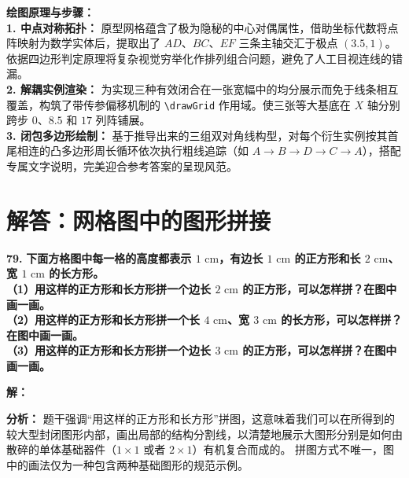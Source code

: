 \vspace{0.4cm}
{\small\color{blue!70!black}
\textbf{绘图原理与步骤：}\\
\textbf{1. 中点对称拓扑：} 原型网格蕴含了极为隐秘的中心对偶属性，借助坐标代数将点阵映射为数学实体后，提取出了 $AD$、$BC$、$EF$ 三条主轴交汇于极点 $(3.5, 1)$。依据四边形判定原理将复杂视觉穷举化作排列组合问题，避免了人工目视连线的错漏。\\
\textbf{2. 解耦实例渲染：} 为实现三种有效闭合在一张宽幅中的均分展示而免于线条相互覆盖，构筑了带传参偏移机制的 \texttt{\textbackslash drawGrid} 作用域。使三张等大基底在 $X$ 轴分别跨步 $0$、$8.5$ 和 $17$ 列阵铺展。\\
\textbf{3. 闭包多边形绘制：} 基于推导出来的三组双对角线构型，对每个衍生实例按其首尾相连的凸多边形周长循环依次执行粗线追踪（如 $A\to B\to D\to C\to A$），搭配专属文字说明，完美迎合参考答案的呈现风范。
}

\newpage



\newpage

\section{解答：网格图中的图形拼接}

\vspace{0.6cm}

\textbf{\LARGE 79.} \textbf{下⾯方格图中每一格的高度都表示 $1\text{ cm}$，有边长 $1\text{ cm}$ 的正方形和长 $2\text{ cm}$、宽 $1\text{ cm}$ 的长方形。\\[1ex]
（1）用这样的正方形和长方形拼一个边长 $2\text{ cm}$ 的正方形，可以怎样拼？在图中画一画。\\[1ex]
（2）用这样的正方形和长方形拼一个长 $4\text{ cm}$、宽 $3\text{ cm}$ 的长方形，可以怎样拼？在图中画一画。\\[1ex]
（3）用这样的正方形和长方形拼一个边长 $3\text{ cm}$ 的正方形，可以怎样拼？在图中画一画。}

\vspace{0.4cm}
\textbf{解：}

\textbf{分析：}
题干强调“用这样的正方形和长方形”拼图，这意味着我们可以在所得到的较大型封闭图形内部，画出局部的结构分割线，以清楚地展示大图形分别是如何由散碎的单体基础器件（$1\times 1$ 或者 $2\times 1$）有机复合而成的。
拼图方式不唯一，图中的画法仅为一种包含两种基础图形的规范示例。

